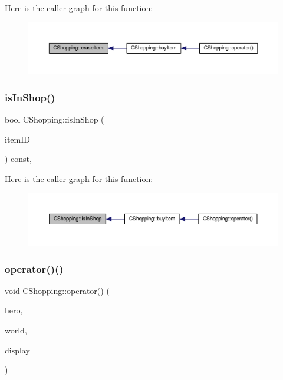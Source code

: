 Here is the caller graph for this function\+:\nopagebreak
\begin{figure}[H]
\begin{center}
\leavevmode
\includegraphics[width=350pt]{class_c_shopping_a83cfae0f7001775fc1d5a5dc097b3e96_icgraph}
\end{center}
\end{figure}
\mbox{\label{class_c_shopping_af06bd6ee3beb6ab523a4b7291a677201}} 
\subsubsection{\texorpdfstring{is\+In\+Shop()}{isInShop()}}
{\footnotesize\ttfamily bool C\+Shopping\+::is\+In\+Shop (\begin{DoxyParamCaption}\item[{int}]{item\+ID }\end{DoxyParamCaption}) const\hspace{0.3cm}{\ttfamily [inline]}, {\ttfamily [protected]}}

Here is the caller graph for this function\+:\nopagebreak
\begin{figure}[H]
\begin{center}
\leavevmode
\includegraphics[width=350pt]{class_c_shopping_af06bd6ee3beb6ab523a4b7291a677201_icgraph}
\end{center}
\end{figure}
\mbox{\label{class_c_shopping_ab72dff2e94f897bd5c3f1ef660e65afb}} 
\subsubsection{\texorpdfstring{operator()()}{operator()()}}
{\footnotesize\ttfamily void C\+Shopping\+::operator() (\begin{DoxyParamCaption}\item[{\mbox{\hyperlink{class_c_hero}{C\+Hero}} \&}]{hero,  }\item[{const \mbox{\hyperlink{class_c_world}{C\+World}} \&}]{world,  }\item[{const \mbox{\hyperlink{class_c_display}{C\+Display}} \&}]{display }\end{DoxyParamCaption})}


